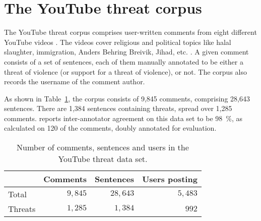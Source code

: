 \documentclass[11pt,letterpaper]{article}
\newcommand{\tov}{threat of violence}
\newcommand{\ds}{the YouTube threat data set}
\begin{document}
\section{The YouTube threat corpus}
\label{sec:data}
The YouTube threat corpus comprises user-written comments from eight different YouTube videos \cite{hammer2014}. The videos cover religious and political topics like halal slaughter, immigration, Anders Behring Breivik, Jihad, etc. \cite{hammer2014}. 
A given comment consists of a set of sentences, each of them manually annotated to be either a \tov{} (or support for a \tov{}), or not. The corpus also records the username
  of the comment author. 

As shown in Table~\ref{tab:dataset}, the corpus consists of 9,845 comments, comprising 28,643 sentences.
There are 1,384 sentences containing threats, spread over 1,285 comments.  reports inter-annotator agreement on this data set to be 98~\%, as calculated on 120 of the comments, doubly annotated for evaluation.

\begin{table}
  \begin{smaller}
    \begin{center}
      \begin{tabular}{lrrr}
        \toprule
  
        & Comments  & Sentences  & Users posting \\
        \midrule
	
  
        Total  & $9,845$  & $28,643$  & $5,483$  \\
        Threats  & $1,285$  & $1,384$  & $992$  \\
        \bottomrule

      \end{tabular}
      \caption{Number of comments, sentences and users in \ds{}.}
      \label{tab:dataset}
    \end{center}
  \end{smaller}
\end{table}
\end{document}

